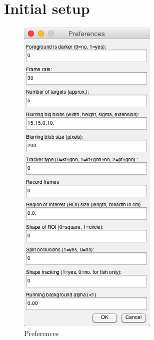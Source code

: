 \documentclass[12pt]{article}
\begin{document}
\section{Initial setup}
\begin{figure}[ht]
\centering
\includegraphics[width=.295\linewidth]{prefs}
\caption{Preferences}
\label{fig:prefs}
\end{figure}
\end{document}
